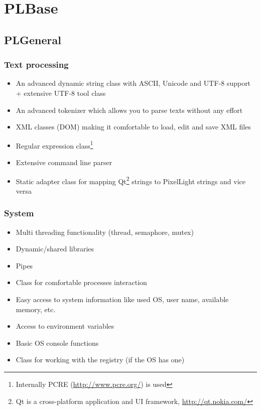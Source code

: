 \chapter{PLBase}




\section{PLGeneral}


\subsection{Text processing}
\begin{itemize}
\item{An advanced dynamic string class with ASCII, Unicode and UTF-8 support + extensive UTF-8 tool class}
\item{An advanced tokenizer which allows you to parse texts without any effort}
\item{XML classes (DOM) making it comfortable to load, edit and save XML files}
\item{Regular expression class\footnote{Internally PCRE (\url{http://www.pcre.org/}) is used}}
\item{Extensive command line parser}
\item{Static adapter class for mapping Qt\footnote{Qt is a cross-platform application and UI framework, \url{http://qt.nokia.com/}} strings to PixelLight strings and vice versa}
\end{itemize}


\subsection{System}
\begin{itemize}
\item{Multi threading functionality (thread, semaphore, mutex)}
\item{Dynamic/shared libraries}
\item{Pipes}
\item{Class for comfortable processes interaction}
\item{Easy access to system information like used OS, user name, available memory, etc.}
\item{Access to environment variables}
\item{Basic OS console functions}
\item{Class for working with the registry (if the OS has one)}
\end{itemize}


